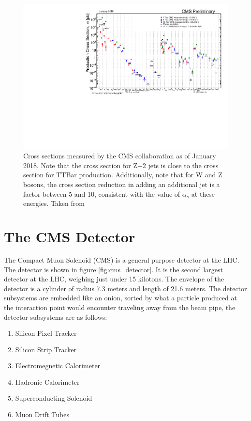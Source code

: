     \begin{figure}[h!]
      \centering
      \includegraphics[width=.7\textwidth]{figures/cms_cross_sections.pdf}
      \caption{Cross sections measured by the CMS collaboration as of January 2018. Note that the cross section for Z+2 jets is close to the cross section for TTBar production. Additionally, note that for W and Z bosons, the cross section reduction in adding an additional jet is a factor between 5 and 10, consistent with the value of $\alpha_s$ at these energies. Taken from \cite{cms_results}}
      \label{fig:cms_cross_sections}
    \end{figure}


\section{The CMS Detector}
  
  The Compact Muon Solenoid (CMS) is a general purpose detector at the LHC. The detector is shown in figure \ref{fig:cms_detector}. It is the second largest detector at the LHC, weighing just under 15 kilotons. The envelope of the detector is a cylinder of radius 7.3 meters and length of 21.6 meters. The detector subsystems are embedded like an onion, sorted by what a particle produced at the interaction point would encounter traveling away from the beam pipe, the detector subsystems are as follows:

  \begin{enumerate}
    \item{Silicon Pixel Tracker}
    \item{Silicon Strip Tracker}
    \item{Electromegnetic Calorimeter}
    \item{Hadronic Calorimeter}
    \item{Superconducting Solenoid}
    \item{Muon Drift Tubes}
  \end{enumerate}

